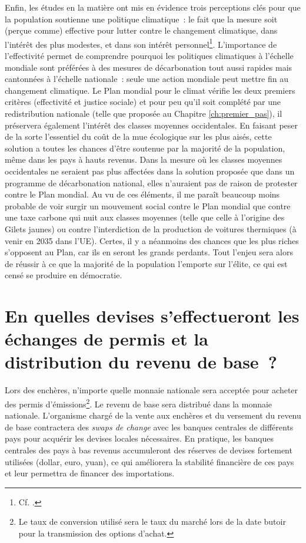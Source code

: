 \documentclass[a5paper,french,openany]{memoir}
\begin{document}
Enfin, les études en la matière ont mis en évidence trois perceptions clés pour que la population soutienne une politique climatique~: le fait que la mesure soit (perçue comme) effective pour lutter contre le changement climatique, dans l'intérêt des plus modestes, et dans son intérêt personnel\footnote{Cf. \cite{dechezlepretre_fighting_2022}.}. L'importance de l'effectivité permet de comprendre pourquoi les politiques climatiques à l'échelle mondiale sont préférées à des mesures de décarbonation tout aussi rapides mais cantonnées à l'échelle nationale~: seule une action mondiale peut mettre fin au changement climatique. Le Plan mondial pour le climat vérifie les deux premiers critères (effectivité et justice sociale) et pour peu qu'il soit complété par une redistribution nationale (telle que proposée au Chapitre \ref{ch:premier_pas}), il préservera également l'intérêt des classes moyennes occidentales. En faisant peser de la sorte l'essentiel du coût de la mue écologique sur les plus aisés, cette solution a toutes les chances d'être soutenue par la majorité de la population, même dans les pays à hauts revenus. Dans la mesure où les classes moyennes occidentales ne seraient pas plus affectées dans la solution proposée que dans un programme de décarbonation national, elles n'auraient pas de raison de protester contre le Plan mondial. Au vu de ces éléments, il me paraît beaucoup moins probable de voir surgir un mouvement social contre le Plan mondial que contre une taxe carbone qui nuit aux classes moyennes (telle que celle à l'origine des Gilets jaunes) ou contre l'interdiction de la production de voitures thermiques (à venir en 2035 dans l'UE). Certes, il y a néanmoins des chances que les plus riches s'opposent au Plan, car ils en seront les grands perdants. Tout l'enjeu sera alors de réussir à ce que la majorité de la population l'emporte sur l'élite, ce qui est censé se produire en démocratie.


\section*{\normalsize En quelles devises s'effectueront les échanges de permis et la distribution du revenu de base~?}\label{q:devise}

Lors des enchères, n'importe quelle monnaie nationale sera acceptée pour acheter des permis d'émissions\footnote{Le taux de conversion utilisé sera le taux du marché lors de la date butoir pour la transmission des options d'achat.}. Le revenu de base sera distribué dans la monnaie nationale. L'organisme chargé de la vente aux enchères et du versement du revenu de base contractera des \textit{swaps de change} avec les banques centrales de différents pays pour acquérir les devises locales nécessaires. En pratique, les banques centrales des pays à bas revenus accumuleront des réserves de devises fortement utilisées (dollar, euro, yuan), ce qui améliorera la stabilité financière de ces pays et leur permettra de financer des importations.
\end{document}
